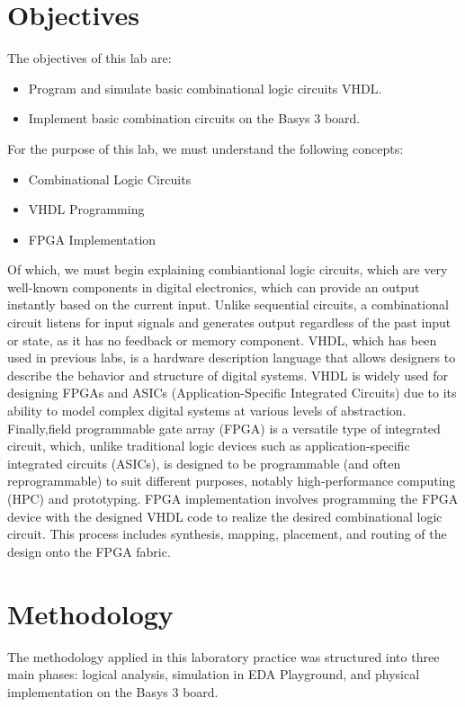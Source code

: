 \documentclass[12pt]{article}  %
\begin{document}
\section{Objectives} %
The objectives of this lab are:
\begin{itemize}
    \item Program and simulate basic combinational logic circuits VHDL.
    \item Implement basic combination circuits on the Basys 3 board.
\end{itemize}
For the purpose of this lab, we must understand the following concepts:
\begin{itemize}
    \item Combinational Logic Circuits
    \item VHDL Programming
    \item FPGA Implementation
\end{itemize}
Of which, we must begin explaining combiantional logic circuits, which are very well-known components in digital electronics, which can provide an output instantly based on the current input. Unlike sequential circuits, a combinational circuit listens for input signals and generates output regardless of the past input or state, as it has no feedback or memory component.\cite{GfGCombinational}
VHDL, which has been used in previous labs, is a hardware description language that allows designers to describe the behavior and structure of digital systems. VHDL is widely used for designing FPGAs and ASICs (Application-Specific Integrated Circuits) due to its ability to model complex digital systems at various levels of abstraction.\cite{IntelVHDLDef}
Finally,field programmable gate array (FPGA) is a versatile type of integrated circuit, which, unlike traditional logic devices such as application-specific integrated circuits (ASICs), is designed to be programmable (and often reprogrammable) to suit different purposes, notably high-performance computing (HPC) and prototyping.\cite{IBMFPGA} FPGA implementation involves programming the FPGA device with the designed VHDL code to realize the desired combinational logic circuit. This process includes synthesis, mapping, placement, and routing of the design onto the FPGA fabric. 
\section{Methodology}
The methodology applied in this laboratory practice was structured into
three main phases: logical analysis, simulation in EDA Playground, and physical
implementation on the Basys 3 board.
\end{document}
